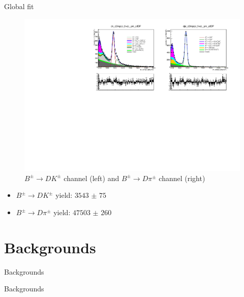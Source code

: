 \documentclass{beamer}
\begin{document}
\begin{frame}{Global fit}
  \begin{figure}
    \centering
    \includegraphics[width = 1.0\textwidth]{Plots/d2kkpipi_fiveL_allDP.pdf}
    \caption{$B^\pm\to DK^\pm$ channel (left) and $B^\pm\to D\pi^\pm$ channel (right)}
  \end{figure}
  \vspace{-0.5cm}
  \begin{itemize}
    \item{$B^\pm\to DK^\pm$ yield: $\SI{3543(75)}{}$}
    \item{$B^\pm\to D\pi^\pm$ yield: $\SI{47503(260)}{}$}
  \end{itemize}
\end{frame}

\section{Backgrounds}
\begin{frame}{Backgrounds}
  \begin{center}
    {\huge Backgrounds}
  \end{center}
\end{frame}
\end{document}
